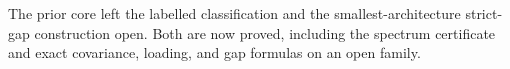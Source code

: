 The prior core left the labelled classification and the smallest-architecture strict-gap construction open. Both are now proved, including the spectrum certificate and exact covariance, loading, and gap formulas on an open family.